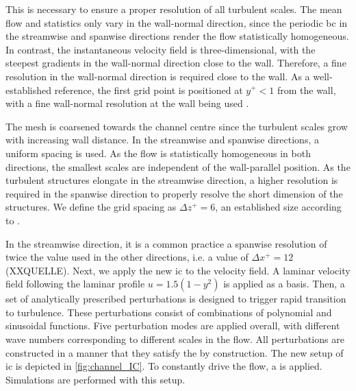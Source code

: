 This is necessary to ensure a proper resolution of all turbulent scales.
The mean flow and  statistics only vary  in the wall-normal direction, since the periodic \acrshort{bc} in the streamwise and spanwise directions render the flow statistically homogeneous.
In contrast, the instantaneous velocity field is three-dimensional, with the steepest gradients in the wall-normal direction close to the wall.
Therefore, a fine resolution in the wall-normal direction is required close to the wall.
As a well-established reference,   the first grid point is positioned at $y^+<1$ from the wall, with a fine wall-normal resolution at the wall being used
 \citep{schlatter_assessment_2010}.

The mesh is coarsened towards the channel centre since the turbulent scales grow with increasing wall distance.
In the streamwise and spanwise directions, a uniform spacing is used. 
%
As the flow is statistically homogeneous in both directions, the smallest scales are independent of the wall-parallel position.
As the turbulent structures elongate in the streamwise direction, a higher resolution is required in the spanwise direction  to properly resolve the short dimension of the structures.
We define the grid spacing as $\Delta z^+= 6$, an established size according to \citep{pope_turbulent_2015}.

In the streamwise direction, it is a common practice  a spanwise resolution of twice the value used in the other directions, i.e. a value of $\Delta x^+= 12$ (XXQUELLE). 
Next, we apply the new \acrshort{ic} to the velocity field.
A laminar velocity field following the laminar profile $u = 1.5(1-y^2)$ is applied as a basis.
Then, a set of analytically prescribed perturbations is designed to trigger rapid transition to turbulence.
These perturbations consist of combinations of polynomial and sinusoidal functions.
Five perturbation modes are applied overall, with different wave numbers corresponding to different scales in the flow.
All perturbations are constructed in a manner that they satisfy the  by construction.
The new setup of \acrshort{ic} is depicted in \autoref{fig:channel_IC}.
To constantly drive the flow, a  is applied. 
Simulations are performed with this setup.




